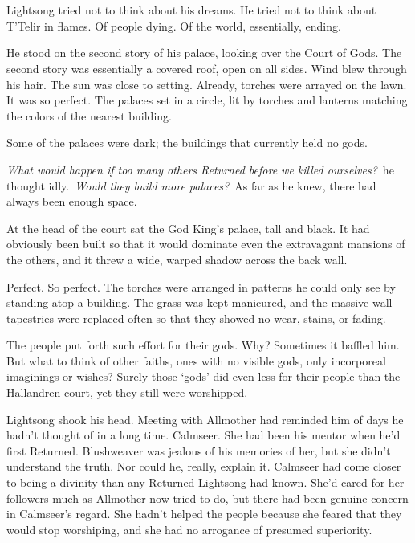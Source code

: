\chapter{}

Lightsong tried not to think about his dreams. He tried not to think about T’Telir in flames. Of people dying. Of the world, essentially, ending.

He stood on the second story of his palace, looking over the Court of Gods. The second story was essentially a covered roof, open on all sides. Wind blew through his hair. The sun was close to setting. Already, torches were arrayed on the lawn. It was so perfect. The palaces set in a circle, lit by torches and lanterns matching the colors of the nearest building.

Some of the palaces were dark; the buildings that currently held no gods.

\textit{What would happen if too many others Returned before we killed ourselves?}~he thought idly.~\textit{Would they build more palaces?}~As far as he knew, there had always been enough space.

At the head of the court sat the God King’s palace, tall and black. It had obviously been built so that it would dominate even the extravagant mansions of the others, and it threw a wide, warped shadow across the back wall.

Perfect. So perfect. The torches were arranged in patterns he could only see by standing atop a building. The grass was kept manicured, and the massive wall tapestries were replaced often so that they showed no wear, stains, or fading.

The people put forth such effort for their gods. Why? Sometimes it baffled him. But what to think of other faiths, ones with no visible gods, only incorporeal imaginings or wishes? Surely those ‘gods’ did even less for their people than the Hallandren court, yet they still were worshipped.

Lightsong shook his head. Meeting with Allmother had reminded him of days he hadn’t thought of in a long time. Calmseer. She had been his mentor when he’d first Returned. Blushweaver was jealous of his memories of her, but she didn’t understand the truth. Nor could he, really, explain it. Calmseer had come closer to being a divinity than any Returned Lightsong had known. She’d cared for her followers much as Allmother now tried to do, but there had been genuine concern in Calmseer’s regard. She hadn’t helped the people because she feared that they would stop worshiping, and she had no arrogance of presumed superiority.

